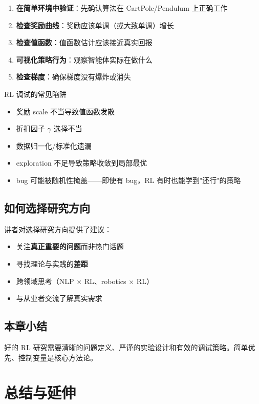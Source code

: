 \documentclass[a4paper]{article}
\begin{document}
\begin{enumerate}
    \item \textbf{在简单环境中验证}：先确认算法在 CartPole/Pendulum 上正确工作
    \item \textbf{检查奖励曲线}：奖励应该单调（或大致单调）增长
    \item \textbf{检查值函数}：值函数估计应该接近真实回报
    \item \textbf{可视化策略行为}：观察智能体实际在做什么
    \item \textbf{检查梯度}：确保梯度没有爆炸或消失
\end{enumerate}

\begin{warningbox}{RL 调试的常见陷阱}
\begin{itemize}
    \item 奖励 scale 不当导致值函数发散
    \item 折扣因子 $\gamma$ 选择不当
    \item 数据归一化/标准化遗漏
    \item exploration 不足导致策略收敛到局部最优
    \item bug 可能被随机性掩盖——即使有 bug，RL 有时也能学到"还行"的策略
\end{itemize}
\end{warningbox}

\subsection{如何选择研究方向}

讲者对选择研究方向提供了建议：
\begin{itemize}
    \item 关注\textbf{真正重要的问题}而非热门话题
    \item 寻找理论与实践的\textbf{差距}
    \item 跨领域思考（NLP $\times$ RL、robotics $\times$ RL）
    \item 与从业者交流了解真实需求
\end{itemize}

\subsection{本章小结}

好的 RL 研究需要清晰的问题定义、严谨的实验设计和有效的调试策略。简单优先、控制变量是核心方法论。

\section{总结与延伸}
\end{document}

